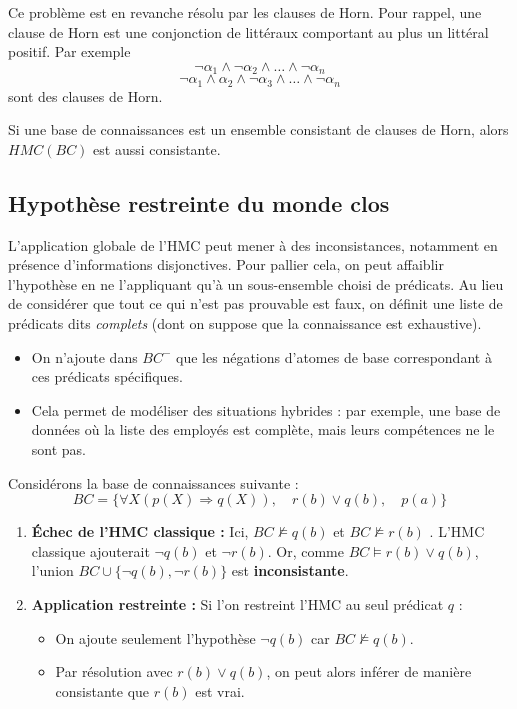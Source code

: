 Ce problème est en revanche résolu par les clauses de Horn. Pour rappel, une clause de Horn est 
une conjonction de littéraux comportant au plus un littéral positif. Par exemple 
    $$ \lnot \alpha_1 \land \lnot \alpha_2 \land \dots \land \lnot \alpha_n $$ 
    $$ \lnot \alpha_1 \land \alpha_2 \land \lnot \alpha_3 \land \dots \land \lnot \alpha_n $$ 
sont des clauses de Horn. 

\begin{corollary}[Consistance]
    Si une base de connaissances est un ensemble consistant de clauses de Horn, alors 
    $HMC(BC)$ est aussi consistante. 
\end{corollary}

\subsection{Hypothèse restreinte du monde clos}

L'application globale de l'HMC peut mener à des inconsistances, notamment en présence d'informations 
disjonctives. Pour pallier cela, on peut affaiblir l'hypothèse en ne l'appliquant qu'à un sous-ensemble choisi de prédicats.
Au lieu de considérer que {tout} ce qui n'est pas prouvable est faux, on définit une liste de prédicats dits \emph{complets} 
(dont on suppose que la connaissance est exhaustive).
\begin{itemize}
    \item On n'ajoute dans $BC^-$ que les négations d'atomes de base correspondant à ces prédicats spécifiques.
    \item Cela permet de modéliser des situations hybrides : par exemple, une base de données où la liste des employés est complète,
     mais leurs compétences ne le sont pas.
\end{itemize}

\begin{example}
    Considérons la base de connaissances suivante :
    $$
        BC = \{ \forall X (p(X) \Rightarrow q(X)), \quad r(b) \lor q(b), \quad p(a) \}
    $$

    \begin{enumerate}
        \item \textbf{Échec de l'HMC classique :} 
        Ici, $BC \not\models q(b)$ et $BC \not\models r(b)$ . L'HMC classique ajouterait $\neg q(b)$ {et} $\neg r(b)$. 
        Or, comme $BC \models r(b) \lor q(b)$, l'union $BC \cup \{\neg q(b), \neg r(b)\}$ est \textbf{inconsistante}.
        
        \item \textbf{Application restreinte :} 
        Si l'on restreint l'HMC au seul prédicat $q$ :
        \begin{itemize}
            \item On ajoute seulement l'hypothèse $\neg q(b)$ car $BC \not\models q(b)$.
            \item Par résolution avec $r(b) \lor q(b)$, on peut alors inférer de manière consistante que $r(b)$ est vrai.
        \end{itemize}
    \end{enumerate}
\end{example}


